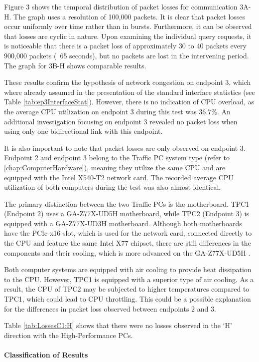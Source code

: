 Figure 3 shows the temporal distribution of packet losses for communication 3A-H. The graph uses a resolution of 100,000 packets.  It is clear that packet losses occur uniformly over time rather than in bursts. Furthermore, it can be observed that losses are cyclic in nature. Upon examining the individual query requests, it is noticeable that there is a packet loss of approximately 30 to 40 packets every 900,000 packets (~65 seconds), but no packets are lost in the intervening period. The graph for 3B-H shows comparable results.

These results confirm the hypothesis of network congestion on endpoint 3, which where already assumed in the presentation of the standard interface statistics (see Table \ref{tab:ep3InterfaceStat}). However, there is no indication of CPU overload, as the average CPU utilization on endpoint 3 during this test was 36.7\%. An additional investigation focusing on endpoint 3 revealed no packet loss when using only one bidirectional link with this endpoint.

It is also important to note that packet losses are only observed on endpoint 3. Endpoint 2 and endpoint 3 belong to the Traffic PC system type (refer to \ref{chap:ComputerHardware}), meaning they utilize the same CPU and are equipped with the Intel X540-T2 network card. The recorded average CPU utilization of both computers during the test  was also almost identical.

The primary distinction between the two Traffic PCs is the motherboard. TPC1 (Endpoint 2) uses a GA-Z77X-UD5H motherboard, while TPC2 (Endpoint 3) is equipped with a GA-Z77X-UD3H motherboard. Although both motherboards have the PCIe x16 slot, which is used for the network card, connected directly to the CPU and feature the same Intel X77 chipset, there are still differences in the components and their cooling, which is more advanced on the GA-Z77X-UD5H \cite{reli04, reli05}.

Both computer systems are equipped with air cooling to provide heat dissipation to the CPU. However, TPC1 is equipped with a superior type of air cooling. As a result, the CPU of TPC2 may be subjected to higher temperatures compared to TPC1, which could lead to CPU throttling. This could be a possible explanation for the differences in packet loss observed between endpoints 2 and 3.

Table \ref{tab:LossesC1:H} shows that there were no losses observed in the `H' direction with the High-Performance PCs.

\paragraph{Classification of Results}

